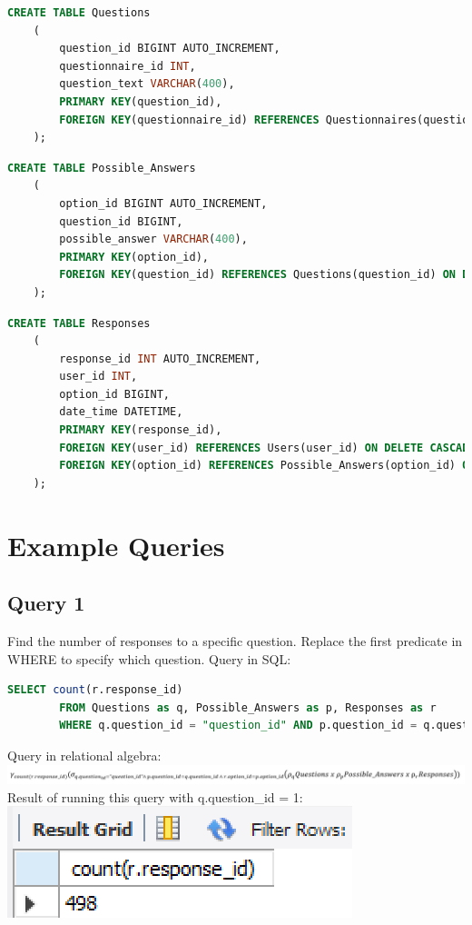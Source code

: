 \documentclass[12pt, oneside, a4paper]{article}
\begin{document}
    \begin{lstlisting}[language=SQL, columns=flexible, breaklines]
    CREATE TABLE Questions
    (
        question_id BIGINT AUTO_INCREMENT,
        questionnaire_id INT,
        question_text VARCHAR(400),
        PRIMARY KEY(question_id),
        FOREIGN KEY(questionnaire_id) REFERENCES Questionnaires(questionnaire_id) ON DELETE CASCADE
    );
    \end{lstlisting}
    \begin{lstlisting}[language=SQL, columns=flexible, breaklines]
    CREATE TABLE Possible_Answers
    (
        option_id BIGINT AUTO_INCREMENT,
        question_id BIGINT,
        possible_answer VARCHAR(400),
        PRIMARY KEY(option_id),
        FOREIGN KEY(question_id) REFERENCES Questions(question_id) ON DELETE CASCADE
    );
    \end{lstlisting}
    \begin{lstlisting}[language=SQL, columns=flexible, breaklines]
    CREATE TABLE Responses
    (
        response_id INT AUTO_INCREMENT,
        user_id INT,
        option_id BIGINT,
        date_time DATETIME,
        PRIMARY KEY(response_id),
        FOREIGN KEY(user_id) REFERENCES Users(user_id) ON DELETE CASCADE,
        FOREIGN KEY(option_id) REFERENCES Possible_Answers(option_id) ON DELETE CASCADE
    );
    \end{lstlisting}
    \section{Example Queries}
    \subsection*{Query 1}
    \noindent Find the number of responses to a specific question. Replace the first predicate in WHERE to specify which question. Query in SQL:
    \begin{lstlisting}[language=SQL, columns=flexible, breaklines]
        SELECT count(r.response_id)
        FROM Questions as q, Possible_Answers as p, Responses as r
        WHERE q.question_id = "question_id" AND p.question_id = q.question_id AND r.option_id = p.option_id
    \end{lstlisting}
    \noindent Query in relational algebra:\\
    \includegraphics{responsecountqueryalgebra.PNG}
    \noindent Result of running this query with q.question\_id = 1:
    \includegraphics{responsecountquery.PNG}
\end{document}
